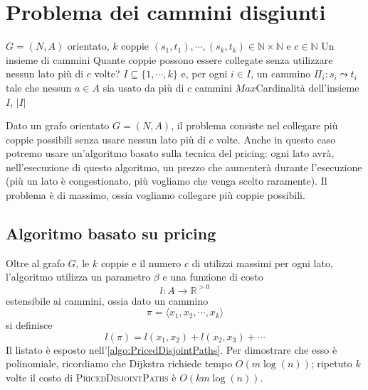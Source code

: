 \section{Problema dei cammini disgiunti}
 {$G = (N,A)$ orientato, $k$ coppie
	$(s_1, t_1), \cdots, (s_k,t_k) \in \mathbb{N} \times \mathbb{N}$ e
	$c \in \mathbb{N}$}
{Un insieme di cammini}
{Quante coppie possono essere collegate senza utilizzare nessun lato più di $c$ volte?}
{$I \subseteq \{1,\cdots,k\}$ e, per ogni $i \in I$, un cammino $\Pi_i : s_i \leadsto t_i$
	tale che nessun $a \in A$ sia usato da più di $c$ cammini}
{$Max$}{Cardinalità dell'insieme $I$, $|I|$}

Dato un grafo orientato $G=(N,A)$, il problema consiste nel collegare più
coppie possibili senza usare nessun lato più di $c$ volte.
Anche in questo caso potremo usare un'algoritmo basato sulla tecnica
del pricing: ogni lato avrà, nell'esecuzione di questo algoritmo,
un prezzo che aumenterà durante l'esecuzione (più un lato è congestionato,
più vogliamo che venga scelto raramente).
Il problema è di massimo, ossia vogliamo collegare più coppie possibili.

\subsection{Algoritmo basato su pricing}
Oltre al grafo $G$, le $k$ coppie e il numero $c$ di utilizzi massimi per ogni lato,
l'algoritmo utilizza un parametro $\beta$ e una funzione di costo
$$
	l: A \rightarrow \mathbb{R}^{>0}
$$
estensibile ai cammini, ossia dato un cammino
$$
	\pi = \langle x_1, x_2, \cdots, x_k \rangle
$$
si definisce
$$
	l(\pi) = l(x_1, x_2) + l(x_2, x_3) + \cdots
$$
Il listato è esposto nell'\cref{algo:PricedDisjointPaths}.
Per dimostrare che esso è polinomiale, ricordiamo che Dijkstra richiede
tempo $O(m \log(n))$; ripetuto $k$ volte il costo di \textsc{PricedDisjointPaths}
è $O(k m \log (n))$.


